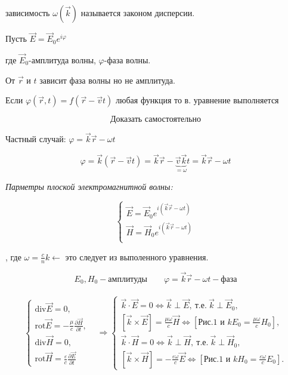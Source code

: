 зависимость \( \omega (\vec{k}) \)  называется законом дисперсии.

Пусть \( \vec{E}=\vec{E}_0 e^{i\varphi}\)

где \( \vec{E}_0 \)-амплитуда волны, \( \varphi \)-фаза волны.

От \( \vec{r} \) и \( t \) зависит фаза волны но не амплитуда.

Если \(\varphi(\vec{r},t)=f(\vec{r}-\vec{v}t) \) любая функция то в. уравнение выполняется 

\[
\boxed{\text{Доказать самостоятельно}}
\]

Частный случай: \( \varphi=\vec{k}\vec{r}-\omega t \) 

\[
\varphi=\vec{k}(\vec{r}-\vec{v}t)=\vec{k}\vec{r}-\underbrace{\vec{v}\vec{k}}_{=\omega}t=\vec{k}\vec{r}-\omega t 
\]

\textit{Парметры плоской электромагнитной волны:}

\[
\begin{cases}
    \vec{E}=\vec{E}_0e^{i(\vec{k}\vec{r}-\omega t)} \\
    \vec{H}=\vec{H}_0e^{i(\vec{k}\vec{r}-\omega t)} \\
\end{cases}
\]

, где \( \omega=\frac{c}{n}k \leftarrow  \) это следует из выполенного уравнения.

\[
E_0,H_0 -\text{амплитуды}   \qquad \varphi=\vec{k}\vec{r}-\omega t - \text{фаза}
\]

\[
\begin{aligned}
    \begin{array}{rl}
        \begin{cases}
            \mathrm{div}\vec{E} = 0, \\
            \mathrm{rot}\vec{E} = -\frac{\mu}{c} \frac{\partial \vec{H}}{\partial t}, \\
            \mathrm{div}\vec{H} = 0, \\
            \mathrm{rot}\vec{H} = \frac{\varepsilon}{c} \frac{\partial \vec{E}}{\partial t}
        \end{cases} 
        & \Rightarrow
        \begin{cases}
            \vec{k} \cdot \vec{E} = 0 \Leftrightarrow \vec{k} \perp \vec{E},\ \text{т.е.}\ \vec{k} \perp \vec{E}_0, \\
            [\vec{k} \times \vec{E}] = \frac{\mu\omega}{c} \vec{H} \Leftrightarrow [\text{Рис.1 и } kE_0 = \frac{\mu\omega}{c}H_0], \\
            \vec{k} \cdot \vec{H} = 0 \Leftrightarrow \vec{k} \perp \vec{H},\ \text{т.е.}\ \vec{k} \perp \vec{H}_0, \\
            [\vec{k} \times \vec{H}] = -\frac{\varepsilon\omega}{c} \vec{E} \Leftrightarrow [\text{Рис.1 и } kH_0 = \frac{\varepsilon\omega}{c}E_0].
        \end{cases}
    \end{array}
\end{aligned}
\]

